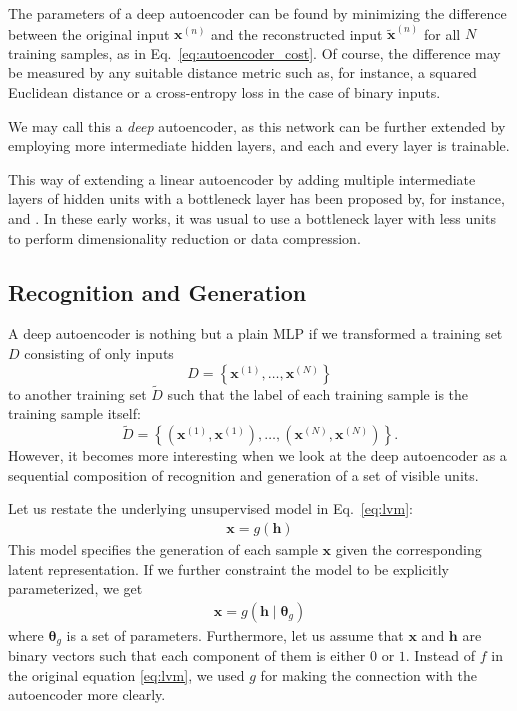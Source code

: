 \documentclass{now}
\newcommand{\vect}[1]{\mathbf{#1}}
\newcommand{\vects}[1]{\boldsymbol{#1}}
\newcommand{\vh}[0]{\vect{h}}
\newcommand{\vx}[0]{\vect{x}}
\newcommand{\TT}[0]{{\vects{\theta}}}
\begin{document}
The parameters of a deep autoencoder can be found by minimizing the difference
between the original input $\vx^{(n)}$ and the reconstructed input
$\tilde{\vx}^{(n)}$ for all $N$ training samples, as in
Eq.~\eqref{eq:autoencoder_cost}. Of course, the difference may be measured by
any suitable distance metric such as, for instance, a squared Euclidean distance
or a cross-entropy loss in the case of binary inputs.

We may call this a \textit{deep} autoencoder, as this network can be further
extended by employing more intermediate hidden layers, and each and every layer
is trainable.

This way of extending a linear autoencoder by adding multiple intermediate
layers of hidden units with a bottleneck layer has been proposed by, for
instance, \citet{Oja1991} and \citet{Kramer1991}. In these early works, it was
usual to use a bottleneck layer with less units to perform dimensionality
reduction or data compression.

\subsection{Recognition and Generation}
\label{sec:autoencoder_prob}

A deep autoencoder is nothing but a plain MLP if we transformed a training set
$D$ consisting of only inputs 
\[
D = \left\{ \vx^{(1)}, \dots, \vx^{(N)} \right\}
\]
to another training set $\tilde{D}$ such that the label of each training sample
is the training sample itself:
\[
\tilde{D} = \left\{ \left( \vx^{(1)}, \vx^{(1)}\right),
\dots, \left( \vx^{(N)}, \vx^{(N)}\right) \right\}.
\]
However, it becomes more interesting when we look at the deep autoencoder as a
sequential composition of recognition and generation of a set of visible units.

Let us restate the underlying unsupervised model in
Eq.~\eqref{eq:lvm}:
\begin{align*}
    \vx = g(\vh) %
\end{align*}
This model specifies the generation of each sample $\vx$ given the corresponding
latent representation. If we further constraint the model to be explicitly
parameterized, we get 
\begin{align*}
    \vx  = g(\vh \mid \TT_g) %
\end{align*}
where $\TT_g$ is a set of parameters. Furthermore, let us assume that $\vx$ and
$\vh$ are binary vectors such that each component of them is either $0$ or $1$.
Instead of $f$ in the original equation \eqref{eq:lvm}, we used $g$ for making
the connection with the autoencoder more clearly.
\end{document}
